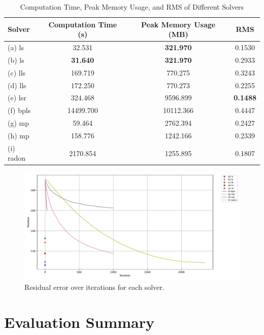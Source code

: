 \begin{table}[!ht]
\centering
\caption{Computation Time, Peak Memory Usage, and RMS of Different Solvers}
\begin{tabularx}{\textwidth}{l C C C}
\toprule
\textbf{Solver} & \textbf{Computation Time (s)} & \textbf{Peak Memory Usage (MB)} & \textbf{RMS} \\
\midrule
(a) ls     &    32.531          &   \textbf{321.970} & 0.1530          \\
(b) ls     &    \textbf{31.640} &   \textbf{321.970} & 0.2933          \\
(c) lls    &   169.719          &   770.275          & 0.3243          \\
(d) lls    &   172.250          &   770.273          & 0.2255          \\
(e) lsr    &   324.468          &  9596.899          & \textbf{0.1488} \\
(f) bpls   & 14499.700          & 10112.366          & 0.4447          \\
(g) mp     &    59.464          &  2762.394          & 0.2427          \\
(h) mp     &   158.776          &  1242.166          & 0.2339          \\
(i) radon  &  2170.854          &  1255.895          & 0.1807          \\
\bottomrule
\end{tabularx}
\end{table}

\begin{figure}[H]
    \centering
    \includegraphics[width=\linewidth]{images/benchmarks/residual_history.pdf}
    \caption{Residual error over iterations for each solver.}
    \label{fig:residual_history}
\end{figure}

\section{Evaluation Summary}

